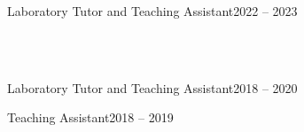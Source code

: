 \begin{cvcontent}
\begin{itemize*}[label=\textcolor{iconcolor}{\textbullet}]
      {Laboratory Tutor and Teaching Assistant}{2022 -- 2023}
  \end{itemize*}
  \\ [4mm]
  \\ [1mm]
  \begin{itemize*}[label=\textcolor{iconcolor}{\textbullet}]
    \item {}
      {Laboratory Tutor and Teaching Assistant}{2018 -- 2020}\\ [0.5mm]
    \item {}
      {Teaching Assistant}{2018 -- 2019}
  \end{itemize*}
\end{cvcontent}